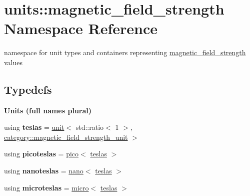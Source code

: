 \hypertarget{namespaceunits_1_1magnetic__field__strength}{}\section{units\+:\+:magnetic\+\_\+field\+\_\+strength Namespace Reference}
\label{namespaceunits_1_1magnetic__field__strength}


namespace for unit types and containers representing \hyperlink{namespaceunits_1_1magnetic__field__strength}{magnetic\+\_\+field\+\_\+strength} values  


\subsection*{Typedefs}
\begin{Indent}{\bf Units (full names plural)}\par
\begin{DoxyCompactItemize}
\item 
\hypertarget{namespaceunits_1_1magnetic__field__strength_a58dbacc3b7fb36731c7e35959497b937}{}using {\bfseries teslas} = \hyperlink{structunits_1_1unit}{unit}$<$ std\+::ratio$<$ 1 $>$, \hyperlink{namespaceunits_1_1category_aac428848b9d8c5e6b21457f61096676a}{category\+::magnetic\+\_\+field\+\_\+strength\+\_\+unit} $>$\label{namespaceunits_1_1magnetic__field__strength_a58dbacc3b7fb36731c7e35959497b937}

\item 
\hypertarget{namespaceunits_1_1magnetic__field__strength_ad57d11b38c05a5f63a488b8b04e07786}{}using {\bfseries picoteslas} = \hyperlink{group___unit_manipulators_ga82a8d14a3e0877a375a66b64c45baab9}{pico}$<$ \hyperlink{structunits_1_1unit}{teslas} $>$\label{namespaceunits_1_1magnetic__field__strength_ad57d11b38c05a5f63a488b8b04e07786}

\item 
\hypertarget{namespaceunits_1_1magnetic__field__strength_a0bbb2f186b63ae15c346a9cb855f46f9}{}using {\bfseries nanoteslas} = \hyperlink{group___unit_manipulators_ga1c25c3c1d6c1f3aed3fd1ecf043110d5}{nano}$<$ \hyperlink{structunits_1_1unit}{teslas} $>$\label{namespaceunits_1_1magnetic__field__strength_a0bbb2f186b63ae15c346a9cb855f46f9}

\item 
\hypertarget{namespaceunits_1_1magnetic__field__strength_ad6e2fc30c8696b0f49323a326b3c3464}{}using {\bfseries microteslas} = \hyperlink{group___unit_manipulators_gaea53c906ec805110b93f02db4a961971}{micro}$<$ \hyperlink{structunits_1_1unit}{teslas} $>$\label{namespaceunits_1_1magnetic__field__strength_ad6e2fc30c8696b0f49323a326b3c3464}


\end{DoxyCompactItemize}
\end{Indent}
